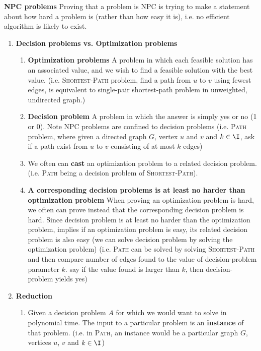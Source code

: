 \documentclass[11pt]{article}
\begin{document}
\begin{defn*}
    \textbf{NPC problems} Proving that a problem is NPC is trying to make a statement about how hard a problem is (rather than how easy it is), i.e. no efficient algorithm is likely to exist. 
    \begin{enumerate}
        \item \textbf{Decision problems vs. Optimization problems} 
        \begin{enumerate}
            \item \textbf{Optimization problems} A problem in which each feasible solution has an associated value, and we wish to find a feasible solution with the best value. (i.e. \textsc{Shortest-Path} problem, find a path from $u$ to $v$ using fewest edges, is equivalent to single-pair shortest-path problem in unweighted, undirected graph.) 
            \item \textbf{Decision problem} A problem in which the answer is simply yes or no (1 or 0). Note NPC problems are confined to decision problems (i.e. \textsc{Path} problem, where given a directed graph $G$, vertex $u$ and $v$ and $k\in \I$, ask if a path exist from $u$ to $v$ consisting of at most $k$ edges)
            \item We often can \textbf{cast} an optimization problem to a related decision problem. (i.e. \textsc{Path} being a decision problem of \textsc{Shortest-Path}). 
            \item \textbf{A corresponding decision problems is at least no harder than optimization problem} When proving an optimization problem is hard, we often can prove instead that the corresponding decision problem is hard. Since decision problem is at least no harder than the optimization problem, implies if an optimization problem is easy, its related decision problem is also easy (we can solve decision problem by solving the optimization problem) (i.e. \textsc{Path} can be solved by solving \textsc{Shortest-Path} and then compare number of edges found to the value of decision-problem parameter $k$. say if the value found is larger than $k$, then decision-problem yields yes)
        \end{enumerate}
        \item \textbf{Reduction} 
        \begin{enumerate}
            \item Given a decision problem $A$ for which we would want to solve in polynomial time. The input to a particular problem is an \textbf{instance} of that problem. (i.e. in \textsc{Path}, an instance would be a particular graph $G$, vertices $u$, $v$ and $k\in \I$)

\end{enumerate}
\end{enumerate}
\end{defn*}
\end{document}
